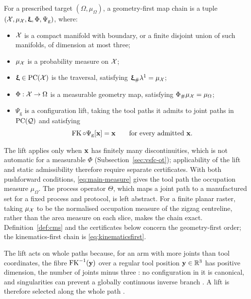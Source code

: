 \begin{definition}
  \label{def:cms}
  For a prescribed target $(\Omega,\mu_\Omega)$, a geometry-first map chain is a tuple
  $(\mathcal{X},\mu_{\mathcal{X}},{\bm{\mathrm{\upxi}}},\Phi,\Psi_{\mathrm{g}})$, where:
  \begin{itemize}
    \item $\mathcal{X}$ is a compact manifold with boundary, or a finite disjoint union of such manifolds, of dimension at most three;
    \item $\mu_{\mathcal{X}}$ is a probability measure on $\mathcal{X}$;
    \item ${\bm{\mathrm{\upxi}}}\in\operatorname{PC}(\mathcal{X})$ is the traversal, satisfying ${\bm{\mathrm{\upxi}}}_\#\lambda^1=\mu_{\mathcal{X}}$;
    \item $\Phi:\mathcal{X}\to\Omega$ is a measurable geometry map, satisfying $\Phi_\#\mu_{\mathcal{X}}=\mu_\Omega$;
    \item $\Psi_{\mathrm{g}}$ is a configuration lift, taking the tool paths it admits to joint paths in $\operatorname{PC}(\mathcal{Q})$ and satisfying
          \begin{equation}
            \label{eq:cms-lift}
            \operatorname{FK}\circ\Psi_{\mathrm{g}}[{\bm{\mathrm{x}}}]={\bm{\mathrm{x}}}\qquad\text{for every admitted }{\bm{\mathrm{x}}}.
          \end{equation}
  \end{itemize}
\end{definition}
The lift applies only when ${\bm{\mathrm{x}}}$ has finitely many discontinuities, which is not automatic for a measurable $\Phi$ (Subsection~\ref{sec:vsfc-ot}); applicability of the lift and static admissibility therefore require separate certificates. With both pushforward conditions, \eqref{eq:main-measure} gives the tool path the occupation measure $\mu_\Omega$. The process operator $\Theta$, which maps a joint path to a manufactured set for a fixed process and protocol, is left abstract. For a finite planar raster, taking $\mu_{\mathcal{X}}$ to be the normalised occupation measure of the zigzag centreline, rather than the area measure on each slice, makes the chain exact. Definition~\ref{def:cms} and the certificates below concern the geometry-first order; the kinematics-first chain is \eqref{eq:kinematicsfirst}.

The lift acts on whole paths because, for an arm with more joints than tool coordinates, the fibre $\operatorname{FK}^{-1}({\bm{\mathrm{y}}})$ over a regular tool position ${\bm{\mathrm{y}}}\in\mathbb R^3$ has positive dimension, the number of joints minus three \cite{burdick1989}: no configuration in it is canonical, and singularities can prevent a globally continuous inverse branch \cite{gottlieb1988robots,pavesic2017topologist,zhang2021singularity}. A lift is therefore selected along the whole path \cite{kazerounian1988global,chalvin2020layer,yang2020coverage}.

